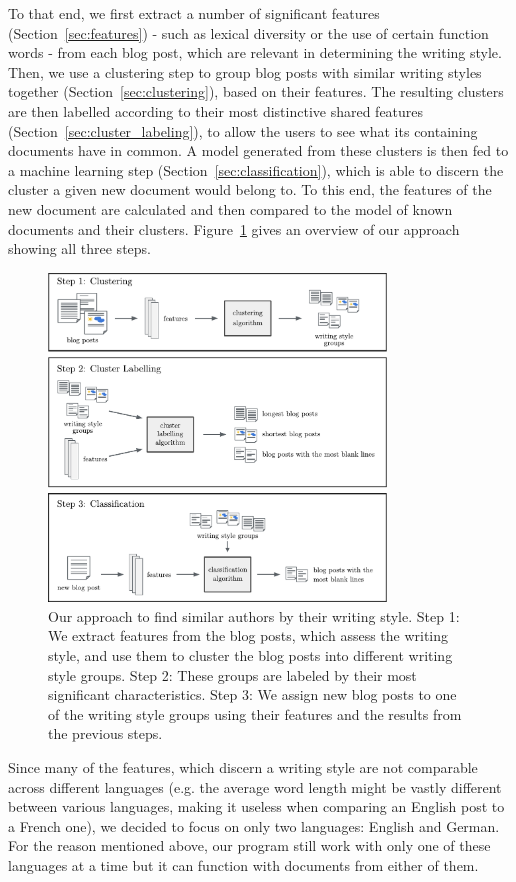 To that end, we first extract a number of significant features (Section~\ref{sec:features}) - such as lexical diversity or the use of certain function words - from each blog post, which are relevant in determining the writing style.
Then, we use a clustering step to group blog posts with similar writing styles together (Section~\ref{sec:clustering}), based on their features.
The resulting clusters are then labelled according to their most distinctive shared features (Section~\ref{sec:cluster_labeling}), to allow the users to see what its containing documents have in common.
A model generated from these clusters is then fed to a machine learning step (Section~\ref{sec:classification}), which is able to discern the cluster a given new document would belong to.
To this end, the features of the new document are calculated and then compared to the model of known documents and their clusters.
Figure~\ref{fig:figure_1} gives an overview of our approach showing all three steps.

\begin{figure}[h]
    \centering
    \includegraphics[width=0.8\textwidth]{images/Figure_1.pdf}
    \caption{Our approach to find similar authors by their writing style. Step 1: We extract features from the blog posts, which assess the writing style, and use them to cluster the blog posts into different writing style groups. Step 2: These groups are labeled by their most significant characteristics. Step 3: We assign new blog posts to one of the writing style groups using their features and the results from the previous steps.}
    \label{fig:figure_1}
\end{figure}

Since many of the features, which discern a writing style are not comparable across different languages (e.g. the average word length might be vastly different between various languages, making it useless when comparing an English post to a French one), we decided to focus on only two languages: English and German.
For the reason mentioned above, our program still work with only one of these languages at a time but it can function with documents from either of them.
